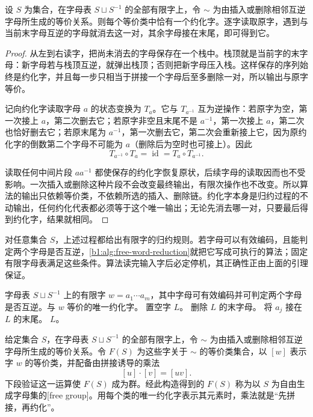 \begin{lemma}\label{b1:lem:unique-reduced-word}
	设 \(S\) 为集合，在字母表 \(S\sqcup S^{-1}\) 的全部有限字上，令 \(\sim\) 为由插入或删除相邻互逆字母所生成的等价关系。则每个等价类中恰有一个约化字。逐字读取原字，遇到与当前末字母互逆的字母就消去这一对，其余字母接在末尾，即可得到它。
\end{lemma}
\begin{proof}
	从左到右读字，把尚未消去的字母保存在一个栈中。栈顶就是当前字的末字母：新字母若与栈顶互逆，就弹出栈顶；否则把新字母压入栈。这样保存的序列始终是约化字，并且每一步只相当于拼接一个字母后至多删除一对，所以输出与原字等价。

	记向约化字读取字母 \(a\) 的状态变换为 \(T_a\)。它与 \(T_{a^{-1}}\) 互为逆操作：若原字为空，第一次接上 \(a\)，第二次删去它；若原字非空且末尾不是 \(a^{-1}\)，第一次接上 \(a\)，第二次也恰好删去它；若原末尾为 \(a^{-1}\)，第一次删去它，第二次会重新接上它，因为原约化字的倒数第二个字母不可能为 \(a\)（删除后为空时也可接上）。因此
	\[
		T_{a^{-1}}\circ T_a=\operatorname{id} =T_a\circ T_{a^{-1}}.
	\]

	读取任何中间片段 \(aa^{-1}\) 都使保存的约化字恢复原状，后续字母的读取因而也不受影响。一次插入或删除这种片段不会改变最终输出，有限次操作也不改变。所以算法的输出只依赖等价类，不依赖所选的插入、删除链。约化字本身是归约过程的不动输出，任何约化代表都必须等于这个唯一输出；无论先消去哪一对，只要最后得到约化字，结果就相同。
\end{proof}

对任意集合 \(S\)，上述过程都给出有限字的归约规则。若字母可以有效编码，且能判定两个字母是否互逆，\cref{b1:alg:free-word-reduction}就把它写成可执行的算法；固定有限字母表满足这些条件。算法读完输入字后必定停机，其正确性正由上面的引理保证。

\begin{algorithm}[htbp]
	\caption{自由字约化}
	\label{b1:alg:free-word-reduction}
	\begin{algorithmsteps}{字母表 \(S\sqcup S^{-1}\) 上的有限字 \(w=a_1\cdots a_m\)，其中字母可有效编码并可判定两个字母是否互逆。}{与 \(w\) 等价的唯一约化字。}
		\State 置空字 \(L\)。
				\State 删除 \(L\) 的末字母。
			\Else
				\State 将 \(a_j\) 接在 \(L\) 的末尾。
			\EndIf
		\EndFor
		\State \Return \(L\)。
	\end{algorithmsteps}
\end{algorithm}

\begin{definition}[自由群的约化字构造]\label{b1:def:free-group-construction}
	给定集合 \(S\)，在字母表 \(S\sqcup S^{-1}\) 的全部有限字上，令 \(\sim\) 为由插入或删除相邻互逆字母所生成的等价关系。令 \(F(S)\) 为这些字关于 \(\sim\) 的等价类集合，以 \([w]\) 表示字 \(w\) 的等价类，并配备由拼接诱导的乘法
	\[
		[u]\cdot[v]=[uv].
	\]
	下段验证这一运算使 \(F(S)\) 成为群。经此构造得到的 \(F(S)\) 称为以 \(S\) 为自由生成字母集的[free group]。用每个类的唯一约化字表示其元素时，乘法就是“先拼接，再约化”。
\end{definition}

